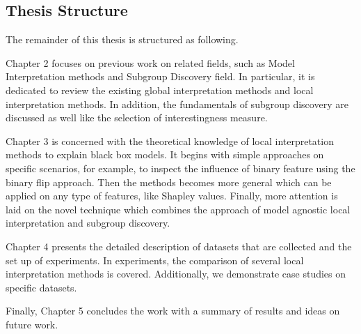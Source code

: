 \subsection{Thesis Structure}

The remainder of this thesis is structured as following. 

Chapter 2 focuses on previous work on related fields, such as Model Interpretation methods and Subgroup Discovery field. In particular, it is dedicated to review the existing global interpretation methods and local interpretation methods. In addition, the fundamentals of subgroup discovery are discussed as well like the selection of interestingness measure.

Chapter 3 is concerned with the theoretical knowledge of local interpretation methods to explain black box models. It begins with simple approaches on specific scenarios, for example, to inspect the influence of binary feature using the binary flip approach. Then the methods becomes more general which can be applied on any type of features, like Shapley values. Finally, more attention is laid on the novel technique which combines the approach of model agnostic local interpretation and subgroup discovery.

Chapter 4 presents the detailed description of datasets that are collected and the set up of experiments. In experiments, the comparison of several local interpretation methods is covered. Additionally, we demonstrate case studies on specific datasets. 

Finally, Chapter 5 concludes the work with a summary of results and  ideas on future work. 